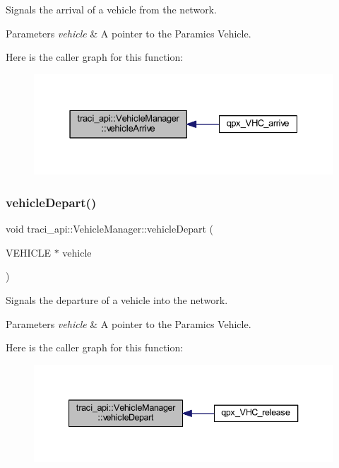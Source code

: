 Signals the arrival of a vehicle from the network. 


\begin{DoxyParams}{Parameters}
{\em vehicle} & A pointer to the Paramics Vehicle. \\
\hline
\end{DoxyParams}
Here is the caller graph for this function\+:
\nopagebreak
\begin{figure}[H]
\begin{center}
\leavevmode
\includegraphics[width=331pt]{classtraci__api_1_1_vehicle_manager_a336d2616be8e4e0c9da5d29d7f122ad6_icgraph}
\end{center}
\end{figure}
\mbox{\label{classtraci__api_1_1_vehicle_manager_a6451b873f33f8a6713df294a81b78d3f}} 
\subsubsection{\texorpdfstring{vehicle\+Depart()}{vehicleDepart()}}
{\footnotesize\ttfamily void traci\+\_\+api\+::\+Vehicle\+Manager\+::vehicle\+Depart (\begin{DoxyParamCaption}\item[{V\+E\+H\+I\+C\+LE $\ast$}]{vehicle }\end{DoxyParamCaption})}



Signals the departure of a vehicle into the network. 


\begin{DoxyParams}{Parameters}
{\em vehicle} & A pointer to the Paramics Vehicle. \\
\hline
\end{DoxyParams}
Here is the caller graph for this function\+:
\nopagebreak
\begin{figure}[H]
\begin{center}
\leavevmode
\includegraphics[width=340pt]{classtraci__api_1_1_vehicle_manager_a6451b873f33f8a6713df294a81b78d3f_icgraph}
\end{center}
\end{figure}


